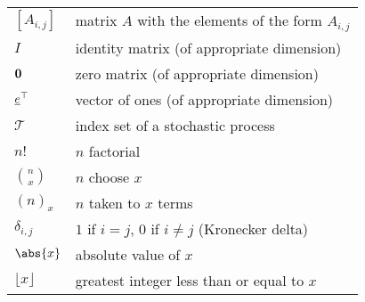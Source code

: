 \begin{tabular}{ll}
    $ [A_{i,j}] $        & matrix $ A $ with the elements of the form $ A_{i,j} $  \\
    $ I $                & identity matrix (of appropriate dimension)              \\
    $ \boldsymbol{0} $       & zero matrix (of appropriate dimension)                  \\
    $ \underline{e}^\top $  & vector of ones (of appropriate dimension)               \\
    $ \mathcal{T} $      & index set of a stochastic process                       \\
    $ n! $               & $ n $ factorial                                         \\
    $ \binom{n}{x} $     & $ n $ choose $ x $                                      \\
    $ (n)_x $            & $ n $ taken to $ x $ terms                              \\
    $ \delta_{i,j} $     & $ 1 $ if $ i=j $, $ 0 $ if $ i\ne j $ (Kronecker delta) \\
    $ \abs{x} $          & absolute value of $ x $                                 \\
    $ \lfloor x\rfloor $ & greatest integer less than or equal to $ x $
\end{tabular}
\newpage

